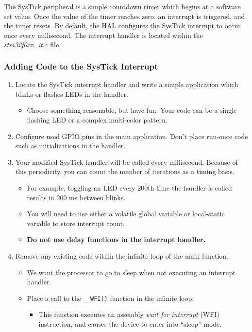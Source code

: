 \documentclass[11pt,fleqn]{book} %
\begin{document}
The SysTick peripheral is a simple countdown timer which begins at a software set value. Once the value of the timer reaches zero, an interrupt is triggered, and the timer resets. By default, the HAL configures the SysTick interrupt to occur once every millisecond. The interrupt handler is located within the \textit{stm32f0xx\_it.c} file.  

\subsubsection{Adding Code to the SysTick Interrupt}

\begin{enumerate}
    \item Locate the SysTick interrupt handler and write a simple application which blinks or flashes LEDs in the handler.
    \begin{itemize}
        \item Choose something reasonable, but have fun. Your code can be a single flashing LED or a complex multi-color pattern. 
    \end{itemize}
    \item Configure used GPIO pins in the main application. Don't place run-once code such as initializations in the handler.
    \item Your modified SysTick handler will be called every millisecond. Because of this periodicity, you can count the number of iterations as a timing basis.  
    \begin{itemize}
        \item For example, toggling an LED every 200th time the handler is called results in 200 ms between blinks. 
        \item You will need to use either a volatile global variable or local-static variable to store interrupt count. 
        \item \textbf{Do not use delay functions in the interrupt handler.}
    \end{itemize}
    \item Remove any existing code within the infinite loop of the main function. 
    \begin{itemize}
        \item We want the processor to go to sleep when not executing an interrupt handler.
        \item Place a call to the \texttt{\_\_WFI()} function in the infinite loop. 
        \begin{itemize}
            \item This function executes an assembly \textit{wait for interrupt} (WFI) instruction, and causes the device to enter into ``sleep'' mode. 
        \end{itemize} 
    \end{itemize}
\end{enumerate}
\end{document}
